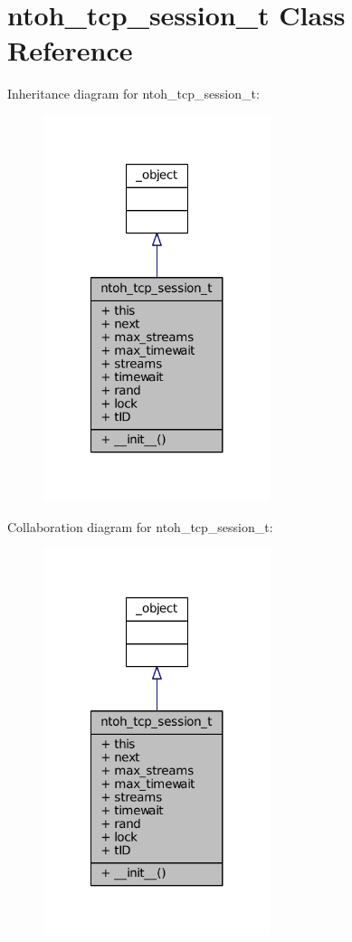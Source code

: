 \hypertarget{classlibntoh_1_1ntoh__tcp__session__t}{\section{ntoh\-\_\-tcp\-\_\-session\-\_\-t Class Reference}
\label{classlibntoh_1_1ntoh__tcp__session__t}
}


Inheritance diagram for ntoh\-\_\-tcp\-\_\-session\-\_\-t\-:
\nopagebreak
\begin{figure}[H]
\begin{center}
\leavevmode
\includegraphics[width=188pt]{classlibntoh_1_1ntoh__tcp__session__t__inherit__graph}
\end{center}
\end{figure}


Collaboration diagram for ntoh\-\_\-tcp\-\_\-session\-\_\-t\-:
\nopagebreak
\begin{figure}[H]
\begin{center}
\leavevmode
\includegraphics[width=188pt]{classlibntoh_1_1ntoh__tcp__session__t__coll__graph}
\end{center}
\end{figure}
